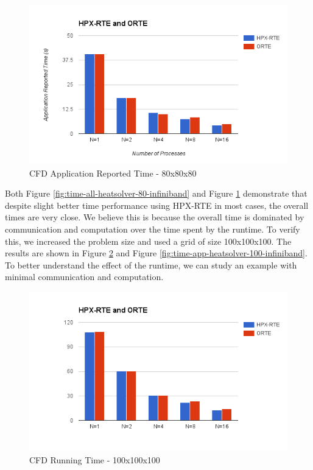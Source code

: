 \begin{figure}[h!]
\centering
\includegraphics[scale=0.7]{images/time-app-heatsolver-80-infiniband.png}
\caption[CFD Application Reported Time - 80x80x80]{CFD Application Reported Time - 80x80x80}
\label{fig:time-app-heatsolver-80-infiniband}
\end{figure}

Both Figure \ref{fig:time-all-heatsolver-80-infiniband} and Figure \ref{fig:time-app-heatsolver-80-infiniband} demonstrate that despite slight better time performance using HPX-RTE in most cases, the overall times are very close. We believe this is because the overall time is dominated by communication and computation over the time spent by the runtime. To verify this, we increased the problem size and used a grid of size 100x100x100. The results are shown in Figure \ref{fig:time-all-heatsolver-100-infiniband} and Figure \ref{fig:time-app-heatsolver-100-infiniband}. To better understand the effect of the runtime, we can study an example with minimal communication and computation. 

\begin{figure}[h!]
\centering
\includegraphics[scale=0.7]{images/time-all-heatsolver-100-infiniband.png}
\caption[CFD Running Time - 100x100x100]{CFD Running Time - 100x100x100}
\label{fig:time-all-heatsolver-100-infiniband}
\end{figure}

